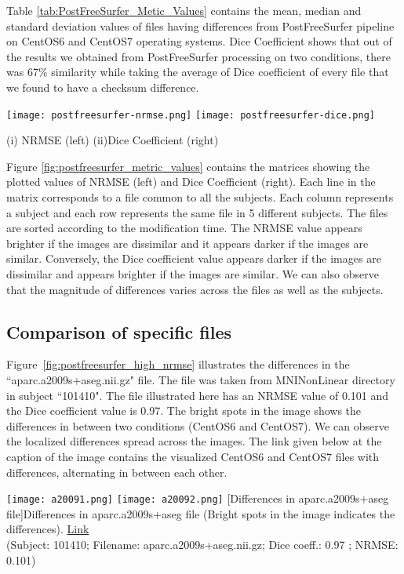 Table \ref{tab:PostFreeSurfer_Metic_Values} contains the mean, median and standard deviation values of files having differences from PostFreeSurfer pipeline on CentOS6 and CentOS7 operating systems. Dice Coefficient shows that out of the results we obtained from PostFreeSurfer processing on two conditions, there was 67\% similarity while taking the average of Dice coefficient of every file that we found to have a checksum difference.

\begin{center}
\texttt{[image: postfreesurfer-nrmse.png]}%
\texttt{[image: postfreesurfer-dice.png]}
\caption*{(i) NRMSE (left) (ii)Dice Coefficient (right)}
\label{fig:postfreesurfer_metric_values}
\end{center}

Figure \ref{fig:postfreesurfer_metric_values} contains the matrices showing the plotted values of NRMSE (left) and Dice Coefficient (right). Each line in the matrix corresponds to a file common to all the subjects. Each column represents a subject and each row represents the same file in 5 different subjects. The files are sorted according to the modification time. The NRMSE value appears brighter if the images are dissimilar and it appears darker if the images are similar. Conversely, the Dice coefficient value appears darker if the images are dissimilar and appears brighter if the images are similar. We can also observe that the magnitude of differences varies across the files as well as the subjects.

\subsection{Comparison of specific files}
Figure~\ref{fig:postfreesurfer_high_nrmse} illustrates the differences in the ``aparc.a2009s+aseg.nii.gz" file. The file was taken from MNINonLinear directory in subject ``101410". The file illustrated here has an NRMSE value of 0.101 and the Dice coefficient value is 0.97. The bright spots in the image shows the differences in between two conditions (CentOS6 and CentOS7). We can observe the localized differences spread across the images. The link given below at the caption of the image contains the visualized CentOS6 and CentOS7 files with differences, alternating in between each other.

\begin{center}
\texttt{[image: a20091.png]}%
\texttt{[image: a20092.png]}
  [Differences in aparc.a2009s+aseg file]{Differences in aparc.a2009s+aseg file (Bright spots in the image indicates the differences). \href{https://drive.google.com/file/d/1eeofWaPyk-A2pQd6LlieQwbMYVOrfeI3/view?usp=sharing}{Link}\\(Subject: 101410; Filename: aparc.a2009s+aseg.nii.gz; Dice coeff.: 0.97 ; NRMSE: 0.101)}
\label{fig:postfreesurfer_high_nrmse}
\end{center}

